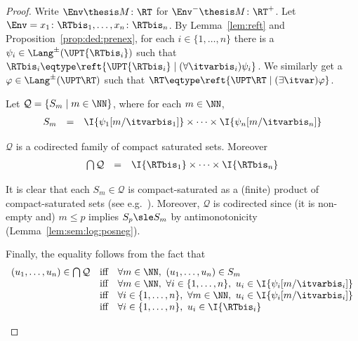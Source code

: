 \begin{proof}
Write $\Env \thesis M \colon \RT$ for $\Env^- \thesis M \colon \RT^+$.
Let $\Env = x_1\colon \RTbis_1,\dots,x_n \colon \RTbis_n$.
By Lemma~\ref{lem:reft} and
Proposition~\ref{prop:ded:prenex},
for each $i \in \{1,\dots,n\}$
there is a $\psi_i \in \Lang^\pm(\UPT{\RTbis_i})$
such that $\RTbis_i \eqtype \reft{\UPT{\RTbis_i} \mid (\forall \itvarbis_i)\psi_i}$.
%
We similarly get a $\varphi \in \Lang^\pm(\UPT\RT)$
such that $\RT \eqtype \reft{\UPT\RT \mid (\exists \itvar)\varphi}$.

Let $\mathcal{Q} = \{S_m \mid m \in \NN\}$,
where for each $m \in \NN$,
\[
\begin{array}{l l l}
  S_m
& =
& \I{\psi_1[m / \itvarbis_1]}
  \times
  \dots
  \times
  \I{\psi_n[m / \itvarbis_n]}
\end{array}
\]


\begin{claim}
$\mathcal{Q}$ is a codirected family of compact saturated sets.
Moreover
\[
\begin{array}{l l l}
  \bigcap \mathcal{Q}
& =
& \I{\RTbis_1}
  \times \dots \times
  \I{\RTbis_n}
\end{array}
\]
\end{claim}

\begin{claimproof}
It is clear that each $S_m \in \mathcal{Q}$
is compact-saturated as a (finite) product of compact-saturated sets
(see e.g.~\cite[Theorem 4.5.12]{goubault13book}).
Moreover, $\mathcal{Q}$ is codirected since (it is non-empty and)
$m \leq p$ implies
$S_p \sle S_m$ by antimonotonicity
(Lemma~\ref{lem:sem:log:posneg}).

Finally, the equality follows from the fact that
\[
\begin{array}{l l l}
  (u_1,\dots,u_n) \in \bigcap \mathcal{Q}
& \text{iff}
& \forall m \in \NN,~ (u_1,\dots,u_n) \in S_m
\\
%
& \text{iff}
& \forall m \in \NN,~
  \forall i \in \{1,\dots,n\},~
  u_i \in \I{\psi_i[m / \itvarbis_i]}
\\
%
& \text{iff}
& \forall i \in \{1,\dots,n\},~
  \forall m \in \NN,~
  u_i \in \I{\psi_i[m / \itvarbis_i]}
\\
%
& \text{iff}
& \forall i \in \{1,\dots,n\},~
  u_i \in \I{\RTbis_i}
\end{array}
\]
\end{claimproof}


\end{proof}
